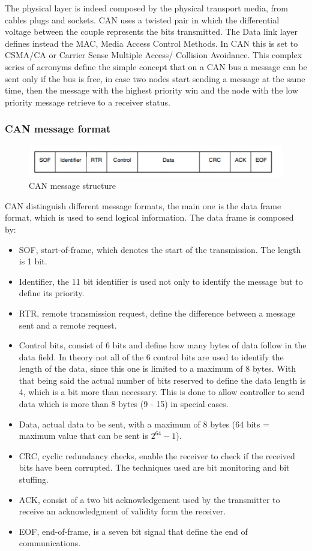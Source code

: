 \documentclass[../main.tex]{subfiles}
\begin{document}
The physical layer is indeed composed by the physical transport media, from cables plugs and sockets. \gls{CAN} uses a twisted pair in which the differential voltage between the couple represents the bits transmitted. The Data link layer defines instead the \gls{MAC}, Media Access Control Methods. In \gls{CAN} this is set to \gls{CSMA/CA} or Carrier Sense Multiple Access/ Collision Avoidance. This complex series of acronyms define the simple concept that on a \gls{CAN} \gls{bus} a message can be sent only if the \gls{bus} is free, in case two nodes start sending a message at the same time, then the message with the highest priority win and the node with the low priority message retrieve to a receiver status.
\subsubsection{CAN message format}
\begin{figure}[H]
    \centering
    \includegraphics[width=\linewidth]{images_folder/can message.png}
    \caption{CAN message structure}
    \label{fig:CANMSG}
\end{figure}
\gls{CAN} distinguish different message formats, the main one is the data frame format, which is used to send logical information. The data frame is composed by:
\begin{itemize}
    \item \gls{SOF}, start-of-frame, which denotes the start of the transmission. The length is 1 bit. 
    \item Identifier, the 11 bit identifier is used not only to identify the message but to define its priority. 
    \item \gls{RTR}, remote transmission request, define the difference between a message sent and a remote request. 
    \item Control bits, consist of 6 bits and define how many bytes of data follow in the data field. In theory not all of the 6 control bits are used to identify the length of the data, since this one is limited to a maximum of 8 bytes. With that being said the actual number of bits reserved to define the data length is 4, which is a bit more than necessary. This is done to allow controller to send data which is more than 8 bytes (9 - 15) in special cases.
    \item Data, actual data to be sent, with a maximum of 8 bytes ($64$ bits = maximum value that can be sent is $2^{64} - 1$).
    \item \gls{CRC}, cyclic redundancy checks, enable the receiver to check if the received bits have been corrupted. The techniques used are bit monitoring and bit stuffing.
    \item \gls{ACK}, consist of a two bit acknowledgement used by the transmitter to receive an acknowledgment of validity form the receiver.
    \item \gls{EOF}, end-of-frame, is a seven bit signal that define the end of communications. 
\end{itemize}
\end{document}

